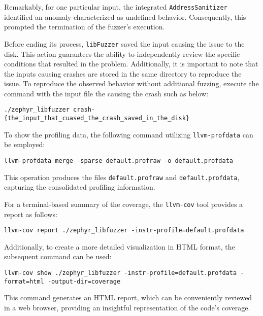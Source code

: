 Remarkably, for one particular input, the integrated \texttt{AddressSanitizer}~\cite{GitHubgo55:online}
identified an anomaly characterized as undefined behavior. Consequently, this prompted
the termination of the fuzzer's execution.

Before ending its process, \texttt{libFuzzer} saved the input causing the issue
to the disk. This action guarantees the ability to independently review the
specific conditions that resulted in the problem. Additionally,
it is important to note that the inputs causing crashes are stored in the same
directory to reproduce the issue. To reproduce the observed
behavior without additional fuzzing, execute the command with the input file
the causing the crash such as below:

\begin{verbatim}
./zephyr_libfuzzer crash-{the_input_that_cuased_the_crash_saved_in_the_disk}
\end{verbatim}

To show the profiling data, the following command utilizing \texttt{llvm-profdata} can be employed:

\begin{verbatim}
llvm-profdata merge -sparse default.profraw -o default.profdata
\end{verbatim}

This operation produces the files \texttt{default.profraw} and \texttt{default.profdata}, capturing the consolidated profiling information.

For a terminal-based summary of the coverage, the \texttt{llvm-cov} tool provides a report as follows:

\begin{verbatim}
llvm-cov report ./zephyr_libfuzzer -instr-profile=default.profdata
\end{verbatim}

Additionally, to create a more detailed visualization in HTML format, the
subsequent command can be used:

\begin{verbatim}
llvm-cov show ./zephyr_libfuzzer -instr-profile=default.profdata -format=html -output-dir=coverage
\end{verbatim}

This command generates an HTML report, which can be conveniently reviewed in a web browser,
providing an insightful representation of the code's coverage.

